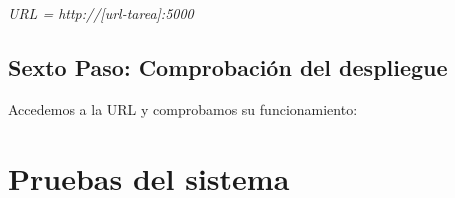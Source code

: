 \textit{URL = http://[url-tarea]:5000}


\subsection{Sexto Paso: Comprobación del despliegue}

Accedemos a la URL y comprobamos su funcionamiento:


\section{Pruebas del sistema}


